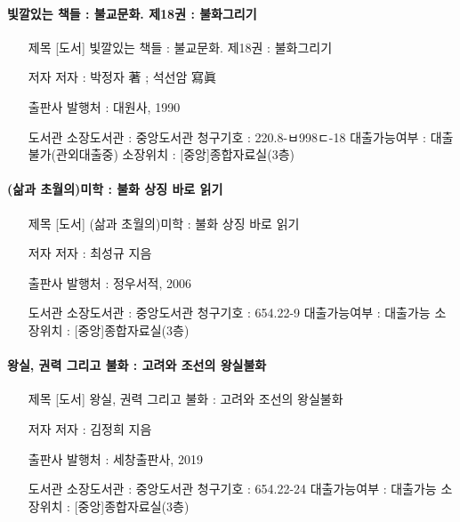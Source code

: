 \documentclass[12pt, a4paper, oneside]{book}
\begin{document}
\paragraph{ 빛깔있는 책들 : 불교문화. 제18권 : 불화그리기 }

\begin{itemize}[					
		topsep=0.0em,			
		parsep=0.0em,			
		itemsep=0em,			
		leftmargin=	5	em,
		labelwidth=	1	em,			
		labelsep=		1	 em			
]					
	\item	[제목]	[도서] 빛깔있는 책들 : 불교문화. 제18권 : 불화그리기	\item	[저자]	저자 : 박정자 著 ; 석선암 寫眞	\item	[출판사]	발행처 : 대원사, 1990	\item	[도서관]	소장도서관 : 중앙도서관	청구기호 : 220.8-ㅂ998ㄷ-18	대출가능여부 : 대출불가(관외대출중)	소장위치 : [중앙]종합자료실(3층)

\end{itemize}					


\paragraph{(삶과 초월의)미학 : 불화 상징 바로 읽기}

\begin{itemize}[					
		topsep=0.0em,			
		parsep=0.0em,			
		itemsep=0em,			
		leftmargin=	5	em,
		labelwidth=	1	em,			
		labelsep=		1	 em			
]					
	\item	[제목]	[도서] (삶과 초월의)미학 : 불화 상징 바로 읽기	\item	[저자]	저자 : 최성규 지음	\item	[출판사]	발행처 : 정우서적, 2006	\item	[도서관]	소장도서관 : 중앙도서관	청구기호 : 654.22-9	대출가능여부 : 대출가능	소장위치 : [중앙]종합자료실(3층)

\end{itemize}					


\paragraph{ 왕실, 권력 그리고 불화 : 고려와 조선의 왕실불화 }

\begin{itemize}[					
		topsep=0.0em,			
		parsep=0.0em,			
		itemsep=0em,			
		leftmargin=	5	em,
		labelwidth=	1	em,			
		labelsep=		1	 em			
]					
	\item	[제목]	[도서] 왕실, 권력 그리고 불화 : 고려와 조선의 왕실불화	\item	[저자]	저자 : 김정희 지음	\item	[출판사]	발행처 : 세창출판사, 2019	\item	[도서관]	소장도서관 : 중앙도서관	청구기호 : 654.22-24	대출가능여부 : 대출가능	소장위치 : [중앙]종합자료실(3층)

\end{itemize}					
\end{document}

